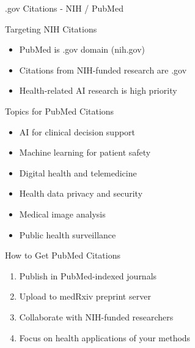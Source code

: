 \documentclass[11pt]{beamer}
\begin{document}
	\begin{frame}{.gov Citations - NIH / PubMed}
		\scriptsize
		\begin{block}{Targeting NIH Citations}
			\begin{itemize}
				\item PubMed is .gov domain (nih.gov)
				\item Citations from NIH-funded research are .gov
				\item Health-related AI research is high priority
			\end{itemize}
		\end{block}
		\begin{block}{Topics for PubMed Citations}
			\begin{itemize}
				\item AI for clinical decision support
				\item Machine learning for patient safety
				\item Digital health and telemedicine
				\item Health data privacy and security
				\item Medical image analysis
				\item Public health surveillance
			\end{itemize}
		\end{block}
		\begin{block}{How to Get PubMed Citations}
			\begin{enumerate}
				\item Publish in PubMed-indexed journals
				\item Upload to medRxiv preprint server
				\item Collaborate with NIH-funded researchers
				\item Focus on health applications of your methods
			\end{enumerate}
		\end{block}
	\end{frame}
	
\end{document}

